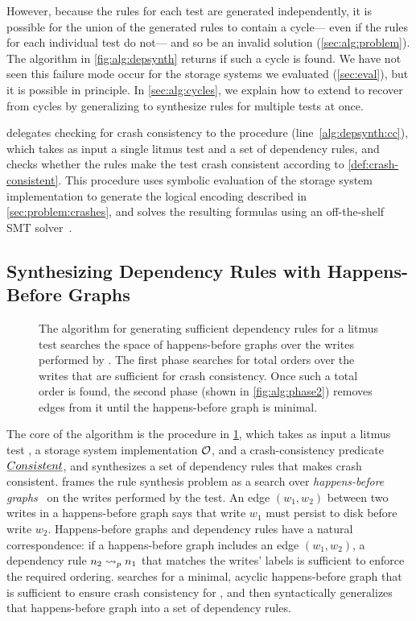 However, because the rules for each test are generated independently,
it is possible for the union of the generated rules to contain a cycle---%
even if the rules for each individual test do not---%
and so be an invalid solution (\cref{sec:alg:problem}).
The algorithm in \cref{fig:alg:depsynth}
returns \UNKNOWN if such a cycle is found.
We have not seen this failure mode occur for the storage systems we evaluated (\cref{sec:eval}),
but it is possible in principle.
In \cref{sec:alg:cycles}, we explain how to extend \depsynthalg
to recover from cycles by generalizing  to synthesize rules for multiple tests at once.

\depsynthalg delegates checking for crash consistency
to the procedure \crashconsistentalg (line~\ref{alg:depsynth:cc}), 
which takes as input a single litmus test
and a set of dependency rules,
and checks whether the rules make the test crash consistent
according to \cref{def:crash-consistent}.
This procedure uses symbolic evaluation of the storage system implementation \sys
to generate the logical encoding described in \cref{sec:problem:crashes},
and solves the resulting formulas using an off-the-shelf SMT solver~\cite{niemetz:boolector}.\tighten

\subsection{Synthesizing Dependency Rules with Happens-Before Graphs}\label{sec:alg:onetest}

\begin{figure}
    \centering
    {}
    \caption{The algorithm for generating sufficient dependency rules for a litmus test \test
    searches the space of happens-before graphs over the writes performed by \test.
    The first phase searches for total orders over the writes that are sufficient for crash consistency.
    Once such a total order is found, the second phase (shown in \autoref{fig:alg:phase2}) removes edges
    from it until the happens-before graph is minimal.}
    \label{fig:alg:rulesfortests}
\end{figure}

The core of the \depsynthalg algorithm is the
 procedure in \cref{fig:alg:rulesfortests},
which takes as input a litmus test \test,
a storage system implementation $\sys$,
and a crash-consistency predicate $\emph{Consistent}$,
and synthesizes a set of dependency rules
that makes \test crash consistent.
 frames the rule synthesis problem
as a search over \emph{happens-before graphs}~\cite{lamport:happens-before}
on the writes performed by the test.
An edge $(w_1, w_2)$ between two writes in a happens-before graph
says that write $w_1$ must persist to disk before write $w_2$.
Happens-before graphs and dependency rules have a natural correspondence:
if a happens-before graph includes an edge $(w_1, w_2)$,
a dependency rule $\deprule{n_2}{n_1}{p}$ that matches the writes' labels
is sufficient to enforce the required ordering.
 searches for a minimal, acyclic happens-before graph
that is sufficient to ensure crash consistency for \test,
and then syntactically generalizes that happens-before graph into a set of dependency rules.

